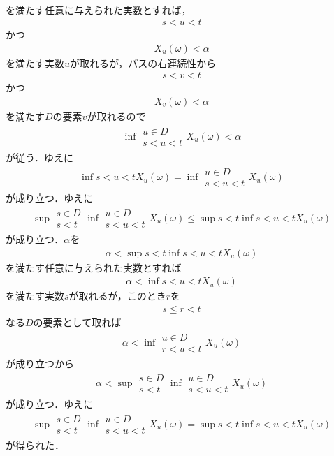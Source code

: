 \begin{sketch}
\begin{description}
\begin{align}
				\end{align}
				を満たす任意に与えられた実数とすれば，
				\begin{align}
					s < u < t
				\end{align}
				かつ
				\begin{align}
					X_u(\omega) < \alpha
				\end{align}
				を満たす実数$u$が取れるが，パスの右連続性から
				\begin{align}
					s < v < t
				\end{align}
				かつ
				\begin{align}
					X_v(\omega) < \alpha
				\end{align}
				を満たす$D$の要素$v$が取れるので
				\begin{align}
					\inf{\substack{u \in D \\ s < u < t}}{X_u(\omega)} < \alpha
				\end{align}
				が従う．ゆえに
				\begin{align}
					\inf{s < u < t}{X_u(\omega)} = \inf{\substack{u \in D \\ s < u < t}}{X_u(\omega)}
				\end{align}
				が成り立つ．ゆえに
				\begin{align}
					\sup{\substack{s \in D \\ s < t}}{\inf{\substack{u \in D \\ s < u < t}}{X_u(\omega)}} 
					\leq \sup{s < t}{\inf{s < u < t}{X_u(\omega)}}
				\end{align}
				が成り立つ．$\alpha$を
				\begin{align}
					\alpha < \sup{s < t}{\inf{s < u < t}{X_u(\omega)}}
				\end{align}
				を満たす任意に与えられた実数とすれば
				\begin{align}
					\alpha < \inf{s < u < t}{X_u(\omega)}
				\end{align}
				を満たす実数$s$が取れるが，このとき$r$を
				\begin{align}
					s \leq r < t
				\end{align}
				なる$D$の要素として取れば
				\begin{align}
					\alpha < \inf{\substack{u \in D \\ r < u < t}}{X_u(\omega)}
				\end{align}
				が成り立つから
				\begin{align}
					\alpha < \sup{\substack{s \in D \\ s < t}}{\inf{\substack{u \in D \\ s < u < t}}{X_u(\omega)}} 
				\end{align}
				が成り立つ．ゆえに
				\begin{align}
					\sup{\substack{s \in D \\ s < t}}{\inf{\substack{u \in D \\ s < u < t}}{X_u(\omega)}} 
					= \sup{s < t}{\inf{s < u < t}{X_u(\omega)}}
				\end{align}
				が得られた．
				

\end{description}
\end{sketch}
